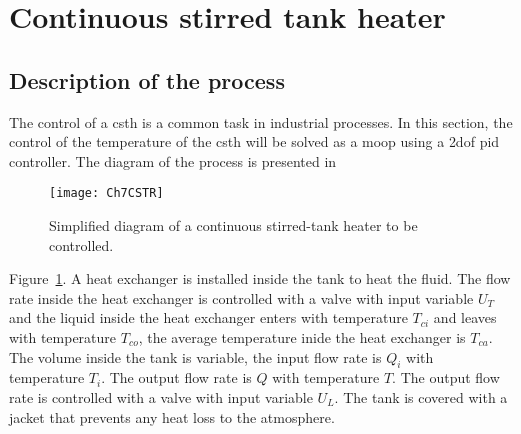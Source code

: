 \section{Continuous stirred tank heater}
\label{sec:CSTH}
%
\subsection{Description of the process}
\label{sec:Description}
%
The control of a \gls{csth} is a common task in industrial processes. In this section, the control of the temperature of the \gls{csth} will be solved as a \gls{moop} using a \gls{2dof} \gls{pid} controller. The diagram of the process is presented in %
\begin{figure}[b]
	\centering
	\texttt{[image: Ch7CSTR]}
	\caption{Simplified diagram of a continuous stirred-tank heater to be controlled.}
	\label{fig:Ch7CSTR}
\end{figure}
Figure~\ref{fig:Ch7CSTR}. A heat exchanger is installed inside the tank to heat the fluid. The flow rate inside the heat exchanger is controlled with a valve with input variable $U_T$ and the liquid inside the heat exchanger enters with temperature $T_{ci}$ and leaves with temperature $T_{co}$, the average temperature inide the heat exchanger is $T_{ca}$. The volume inside the tank is variable, the input flow rate is $Q_i$ with temperature $T_i$. The output flow rate is $Q$ with temperature $T$. The output flow rate is controlled with a valve with input variable $U_L$. The tank is covered with a jacket that prevents any heat loss to the atmosphere.

